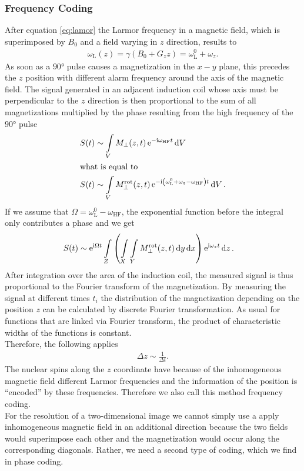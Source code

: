 \subsubsection{Frequency Coding}
After equation \ref{eq:lamor} the Larmor frequency in a magnetic field, which is superimposed by $B_0$ and a field varying in $z$ direction, results to
\begin{align}
\omega_\text{L}(z)=\gamma(B_0+G_zz)=\omega_\text{L}^0+\omega_z.
\end{align}
As soon as a $\ang{90}$ pulse causes a magnetization in the $x-y$ plane, this precedes the $z$ position with different alarm frequency around the axis of the magnetic field.
The signal generated in an adjacent induction coil whose axis must be perpendicular to the $z$ direction is then proportional to the sum of all magnetizations multiplied by the phase resulting from the high frequency of the $\ang{90}$ pulse
\begin{align}
S(t)&\sim\int\limits_V M_\bot(z,t)\,\mathrm{e}^{-\mathrm{i}\omega_\text{HF}t}\dd{V}\\
\intertext{what is equal to}
S(t)&\sim\int\limits_V M_\bot^\text{rot}(z,t)\,\mathrm{e}^{-\mathrm{i}\left(\omega_\text{L}^0+\omega_z-\omega_\text{HF}\right)t}\dd{V}.
\end{align}
If we assume that $\Omega=\omega_\text{L}^0-\omega_\text{HF}$, the exponential function before the integral only contributes a phase and we get
\begin{align}
S(t)&\sim\mathrm{e}^{\mathrm{i}\Omega t}\int\limits_Z\left(\int\limits_X\int\limits_Y M_\bot^\text{rot}(z,t)\dd{y}\dd{x}\right)\mathrm{e}^{\mathrm{i}\omega_z t}\dd{z}.
\end{align}
After integration over the area of the induction coil, the measured signal is thus proportional to the Fourier transform of the magnetization.
By measuring the signal at different times $t_i$ the distribution of the magnetization depending on the position $z$ can be calculated by discrete Fourier transformation.
As usual for functions that are linked via Fourier transform, the product of characteristic widths of the functions is constant.\\
Therefore, the following applies
\begin{align}
\Delta z\sim\frac{1}{\Delta t}.
\end{align}
The nuclear spins along the $z$ coordinate have because of the inhomogeneous magnetic field different Larmor frequencies and the information of the position is \enquote{encoded} by these frequencies.
Therefore we also call this method frequency coding.\\
For the resolution of a two-dimensional image we cannot simply use a
apply inhomogeneous magnetic field in an additional direction because the two fields would superimpose each other and the magnetization would occur along the corresponding diagonals.
Rather, we need a second type of coding, which we find in phase coding.

